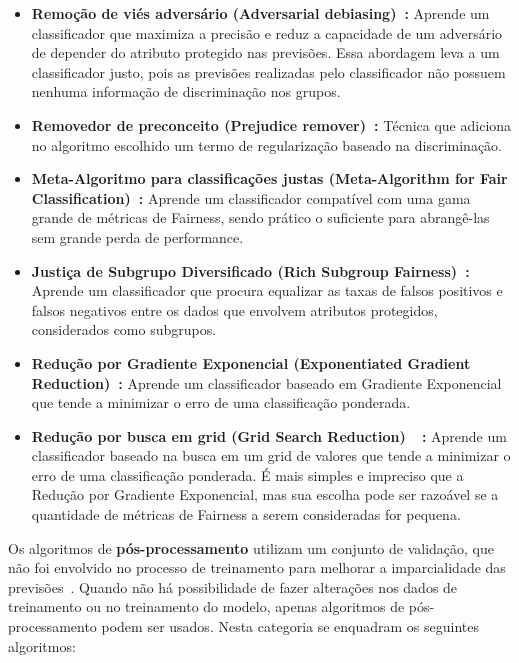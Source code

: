 \documentclass[portugues]{ic-tese}
\begin{document}
\begin{itemize}
\item \textbf{Remoção de viés adversário (Adversarial debiasing)~\citep{Zhang_2018}:} Aprende um classificador que maximiza a precisão e reduz a capacidade de um adversário de depender do atributo protegido nas previsões. Essa abordagem leva a um classificador justo, pois as previsões realizadas pelo classificador não possuem nenhuma informação de discriminação nos grupos.

\item \textbf{Removedor de preconceito (Prejudice remover)~\citep{Feldman_2015}:} Técnica que adiciona no algoritmo escolhido um termo de regularização baseado na discriminação.

\item \textbf{Meta-Algoritmo para classificações justas (Meta-Algorithm for Fair Classification)~\citep{Celis_2019}:} Aprende um classificador compatível com uma gama grande de métricas de Fairness, sendo prático o suficiente para abrangê-las sem grande perda de performance.

\item \textbf{Justiça de Subgrupo Diversificado (Rich Subgroup Fairness)~\citep{Kearns_2018}:} Aprende um classificador que procura equalizar as taxas de falsos positivos e falsos negativos entre os dados que envolvem atributos protegidos, considerados como subgrupos.

\item \textbf{Redução por Gradiente Exponencial (Exponentiated Gradient Reduction)~\citep{Agarwal_2018}:} Aprende um classificador baseado em Gradiente Exponencial que tende a minimizar o erro de uma classificação ponderada.

\item \textbf{Redução por busca em grid (Grid Search Reduction)~\citep{Agarwal_2018}~\citep{Agarwal_2019}:} Aprende um classificador baseado na busca em um grid de valores que tende a minimizar o erro de uma classificação ponderada. É mais simples e impreciso que a Redução por Gradiente Exponencial, mas sua escolha pode ser razoável se a quantidade de métricas de Fairness a serem consideradas for pequena.

\end{itemize}

Os algoritmos de \textbf{pós-processamento} utilizam um conjunto de validação, que não foi envolvido no processo de treinamento para melhorar a imparcialidade das previsões~\citep{dAlessandro_2017}. Quando não há possibilidade de fazer alterações nos dados de treinamento ou no treinamento do modelo, apenas algoritmos de pós-processamento podem ser usados. Nesta categoria se enquadram os seguintes algoritmos:
\end{document}
